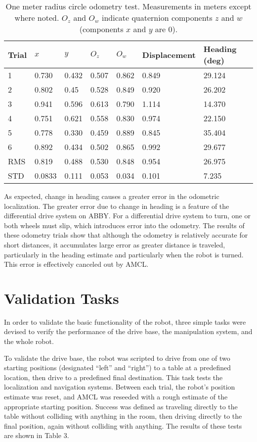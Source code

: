 \documentclass[]{cwru} %
\begin{document}
\begin{table}
\label{tab:loc_trials}
\caption{One meter radius circle odometry test. Measurements in meters except
where noted. $O_z$ and $O_w$ indicate quaternion components $z$ and $w$
(components $x$ and $y$ are 0).}
\begin{tabular}[c]{@{}lllllll@{}}
\\
\toprule
\textbf{Trial} & \textbf{$x$} & \textbf{$y$} & \textbf{$O_z$} & \textbf{$O_w$} &
\textbf{Displacement} & \textbf{Heading (deg)}\tabularnewline
\midrule
1 & 0.730 & 0.432 & 0.507 & 0.862 & 0.849 & 29.124\tabularnewline
2 & 0.802 & 0.45 & 0.528 & 0.849 & 0.920 & 26.202\tabularnewline
3 & 0.941 & 0.596 & 0.613 & 0.790 & 1.114 & 14.370\tabularnewline
4 & 0.751 & 0.621 & 0.558 & 0.830 & 0.974 & 22.150\tabularnewline
5 & 0.778 & 0.330 & 0.459 & 0.889 & 0.845 & 35.404\tabularnewline
6 & 0.892 & 0.434 & 0.502 & 0.865 & 0.992 & 29.677\tabularnewline
\midrule
RMS & 0.819 & 0.488 & 0.530 & 0.848 & 0.954 & 26.975\tabularnewline
\midrule
STD & 0.0833 & 0.111 & 0.053 & 0.034 & 0.101 & 7.235\tabularnewline
\bottomrule
\end{tabular}
\end{table}

As expected, change in heading causes a greater error in the odometric
localization. The greater error due to change in heading is a feature of
the differential drive system on ABBY. For a differential drive system
to turn, one or both wheels must slip, which introduces error into the
odometry. The results of these odometry trials show that although the
odometry is relatively accurate for short distances, it accumulates
large error as greater distance is traveled, particularly in the heading
estimate and particularly when the robot is turned. This error is
effectively canceled out by AMCL.

\section{Validation Tasks}

In order to validate the basic functionality of the robot, three simple
tasks were devised to verify the performance of the drive base, the
manipulation system, and the whole robot.

To validate the drive base, the robot was scripted to drive from one of
two starting positions (designated ``left'' and ``right'') to a table at
a predefined location, then drive to a predefined final destination.
This task tests the localization and navigation systems. Between each
trial, the robot's position estimate was reset, and AMCL was reseeded
with a rough estimate of the appropriate starting position. Success was
defined as traveling directly to the table without colliding with
anything in the room, then driving directly to the final position, again
without colliding with anything. The results of these tests are shown in
Table 3.
\end{document}
